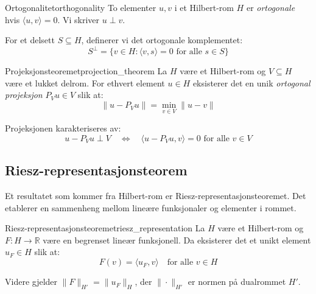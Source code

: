 \begin{definition}{Ortogonalitet}{orthogonality}
	To elementer $u, v$ i et Hilbert-rom $H$ er \emph{ortogonale} hvis $\langle u, v \rangle = 0$. Vi skriver $u \perp v$.

	For et delsett $S \subseteq H$, definerer vi det ortogonale komplementet:
	\begin{equation}
		S^\perp = \{v \in H : \langle v, s \rangle = 0 \text{ for alle } s \in S\}
	\end{equation}
\end{definition}

\begin{theorem}{Projeksjonsteoremet}{projection_theorem}
	La $H$ være et Hilbert-rom og $V \subseteq H$ være et lukket delrom. For ethvert element $u \in H$ eksisterer det en unik \emph{ortogonal projeksjon} $P_V u \in V$ slik at:
	\begin{equation}
		\|u - P_V u\| = \min_{v \in V} \|u - v\|
	\end{equation}

	Projeksjonen karakteriseres av:
	\begin{equation}
		u - P_V u \perp V \quad \Leftrightarrow \quad \langle u - P_V u, v \rangle = 0 \text{ for alle } v \in V
	\end{equation}
\end{theorem}

%   

\subsection{Riesz-representasjonsteorem}

Et resultatet som kommer fra Hilbert-rom er Riesz-representasjonsteoremet. Det  etablerer en sammenheng mellom lineære funksjonaler og elementer i rommet.

\begin{theorem}{Riesz-representasjonsteoremet}{riesz_representation}
	La $H$ være et Hilbert-rom og $F : H \to \mathbb{R}$ være en begrenset lineær funksjonell. Da eksisterer det et unikt element $u_F \in H$ slik at:
	\begin{equation}
		F(v) = \langle u_F, v \rangle \quad \text{for alle } v \in H
	\end{equation}

	Videre gjelder $\|F\|_{H'} = \|u_F\|_H$, der $\|\cdot\|_{H'}$ er normen på dualrommet $H'$.
\end{theorem}

